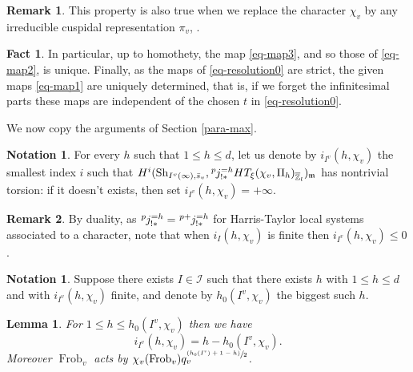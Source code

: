 \documentclass[JEP,XML,SOM,Unicode,published]{cedram}
\newcommand{\psfrac}[2]{\sfrac{(#1)}{#2}}
\theoremstyle{plain}
\newtheorem{lemma}[equation]{Lemma}
\theoremstyle{definition}
\newtheorem*{remark}{Remark}
\newtheorem{nota}[equation]{Notation}
\newtheorem*{fact}{Fact}
\numberwithin{equation}{subsection}
\newcommand\Zm{{\mathbb Z}}
\newcommand\IC{{\mathcal I}}
\newcommand{\lexp}[2]{\kern \scriptspace \vphantom{#2}^{#1}\kern-\scriptspace#2}
\DeclareMathOperator{\sh}{Sh}
\DeclareMathOperator{\frob}{Frob}
\let \oo=\infty
\begin{document}
\begin{remark}
This property is also true when we replace the character $\chi_v$ by
any irreducible cuspidal representation $\pi_v$, \cf \cite{boyer-duke}.
\end{remark}

\begin{fact}
In particular, up to homothety, the map \eqref{eq-map3}, and so those of \eqref{eq-map2}, is
unique. Finally, as the maps of \eqref{eq-resolution0} are strict, the given maps \eqref{eq-map1}
are uniquely determined, that is, if we forget the infinitesimal parts these maps are independent
of the chosen $t$ in \eqref{eq-resolution0}.
\end{fact}

We now copy the arguments of Section \ref{para-max}.

\begin{nota} \label{nota-ih}
For every $h$ such that $1 \leq h \leq d$, let us denote by $i_{I^v}(h,\chi_v)$ the smallest index $i$
such that
$H^i(\sh_{I^{v}(\oo),\bar s_v},\lexp p j^{=h}_{!*} HT_\xi(\chi_{v},\Pi_h)_{\overline \Zm_l})_{\mathfrak m}$
has nontrivial torsion: if it doesn't exists, then set $i_{I^v}(h,\chi_v)=+\oo$.
\end{nota}

\begin{remark}
By duality, as
$\lexp p j_{!*}^{=h}=\lexp {p+} j^{=h}_{!*}$ for Harris-Taylor local systems
associated to a
character, note that when $i_I(h,\chi_v)$ is finite then $i_{I^v}(h,\chi_v) \leq 0$.
\end{remark}

\begin{nota} \label{nota-h0}
Suppose there exists $I \in \IC$ such that
there exists $h$ with $1 \leq h \leq d$ and with $i_{I^v}(h,\chi_v)$ finite, and denote by
$h_0(I^v,\chi_v)$
the biggest such $h$.
\end{nota}

\begin{lemma} \label{lem-torsion-min}
For $1 \leq h \leq h_0(I^v,\chi_v)$ then we have
\[
i_{I^v}(h,\chi_v)=h-h_0(I^v,\chi_v).
\]
Moreover $\frob_v$ acts by $\chi_v(\frob_v) q_v^{\psfrac{h_0(I^v)+1-h}{2}}$.
\end{lemma}
\end{document}
